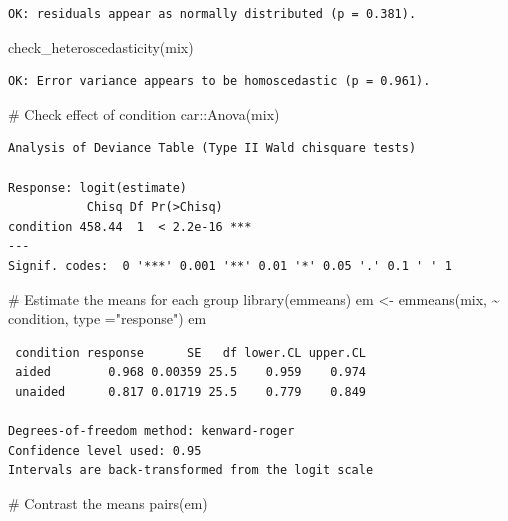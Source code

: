 \documentclass[
  letterpaper,
]{book}
\newenvironment{Shaded}{\begin{snugshade}}{\end{snugshade}}
\newcommand{\AttributeTok}[1]{\textcolor[rgb]{0.40,0.45,0.13}{#1}}
\newcommand{\CommentTok}[1]{\textcolor[rgb]{0.37,0.37,0.37}{#1}}
\newcommand{\FunctionTok}[1]{\textcolor[rgb]{0.28,0.35,0.67}{#1}}
\newcommand{\NormalTok}[1]{\textcolor[rgb]{0.00,0.23,0.31}{#1}}
\newcommand{\OtherTok}[1]{\textcolor[rgb]{0.00,0.23,0.31}{#1}}
\newcommand{\SpecialCharTok}[1]{\textcolor[rgb]{0.37,0.37,0.37}{#1}}
\newcommand{\StringTok}[1]{\textcolor[rgb]{0.13,0.47,0.30}{#1}}
\begin{document}
\begin{verbatim}
OK: residuals appear as normally distributed (p = 0.381).
\end{verbatim}

\begin{Shaded}
\begin{Highlighting}[]
\FunctionTok{check\_heteroscedasticity}\NormalTok{(mix)}
\end{Highlighting}
\end{Shaded}

\begin{verbatim}
OK: Error variance appears to be homoscedastic (p = 0.961).
\end{verbatim}

\begin{Shaded}
\begin{Highlighting}[]
\CommentTok{\# Check effect of condition}
\NormalTok{car}\SpecialCharTok{::}\FunctionTok{Anova}\NormalTok{(mix)}
\end{Highlighting}
\end{Shaded}

\begin{verbatim}
Analysis of Deviance Table (Type II Wald chisquare tests)

Response: logit(estimate)
           Chisq Df Pr(>Chisq)    
condition 458.44  1  < 2.2e-16 ***
---
Signif. codes:  0 '***' 0.001 '**' 0.01 '*' 0.05 '.' 0.1 ' ' 1
\end{verbatim}

\begin{Shaded}
\begin{Highlighting}[]
\CommentTok{\# Estimate the means for each group}
\FunctionTok{library}\NormalTok{(emmeans)}
\NormalTok{em }\OtherTok{\textless{}{-}} \FunctionTok{emmeans}\NormalTok{(mix, }\SpecialCharTok{\textasciitilde{}}\NormalTok{ condition, }\AttributeTok{type =}\StringTok{"response"}\NormalTok{)}
\NormalTok{em}
\end{Highlighting}
\end{Shaded}

\begin{verbatim}
 condition response      SE   df lower.CL upper.CL
 aided        0.968 0.00359 25.5    0.959    0.974
 unaided      0.817 0.01719 25.5    0.779    0.849

Degrees-of-freedom method: kenward-roger 
Confidence level used: 0.95 
Intervals are back-transformed from the logit scale 
\end{verbatim}

\begin{Shaded}
\begin{Highlighting}[]
\CommentTok{\# Contrast the means}
\FunctionTok{pairs}\NormalTok{(em)}
\end{Highlighting}
\end{Shaded}
\end{document}
